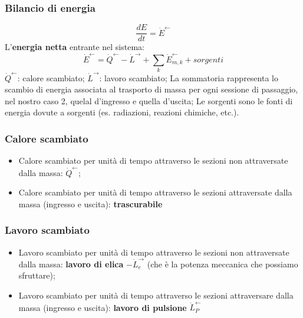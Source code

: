 \subsubsection{Bilancio di energia}
\[
    \frac{dE}{dt}=\dot{E}^\leftarrow 
\]
L'\textbf{energia netta} entrante nel sistema:
\[
    \dot{E}^\leftarrow = \dot{Q}^\leftarrow - \dot{L}^\rightarrow + \sum_{k}\dot{E}_{m,k}^\leftarrow  + sorgenti
\]
$\dot{Q}^\leftarrow $: calore scambiato;\newline
$\dot{L}^\rightarrow $: lavoro scambiato;\newline
La sommatoria rappresenta lo scambio di energia associata al trasporto di massa per ogni sessione di passaggio, nel nostro caso 2, quelal d'ingresso e quella d'uscita;\newline
Le sorgenti sono le fonti di energia dovute a sorgenti (es. radiazioni, reazioni chimiche, etc.).\newline
\subsubsection{Calore scambiato}
\begin{itemize}
    \item Calore scambiato per unità di tempo attraverso le sezioni non attraversate dalla massa: $\dot{Q}^\leftarrow $;
    \item Calore scambiato per unità di tempo attraverso le sezioni attraversate dalla massa (ingresso e uscita): \textbf{trascurabile}
\end{itemize}
\subsubsection{Lavoro scambiato}
\begin{itemize}
    \item Lavoro scambiato per unità di tempo attraverso le sezioni non attraversate dalla massa: \textbf{lavoro di elica} $-\dot{L}_e^\rightarrow $ (che è la potenza meccanica che possiamo sfruttare);
    \item Lavoro scambiato per unità di tempo attraverso le sezioni attraversare dalla massa (ingresso e uscita): \textbf{lavoro di pulsione} $\dot{L}_P^\leftarrow $
\end{itemize}
